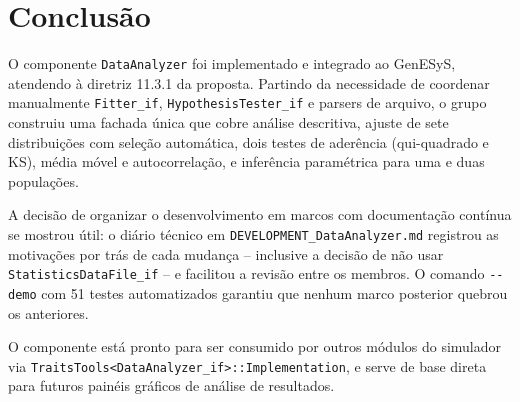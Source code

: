 \section{Conclusão}

O componente \texttt{DataAnalyzer} foi implementado e integrado ao GenESyS, atendendo à diretriz 11.3.1 da proposta. Partindo da necessidade de coordenar manualmente \texttt{Fitter\_if}, \texttt{HypothesisTester\_if} e parsers de arquivo, o grupo construiu uma fachada única que cobre análise descritiva, ajuste de sete distribuições com seleção automática, dois testes de aderência (qui-quadrado e KS), média móvel e autocorrelação, e inferência paramétrica para uma e duas populações.

A decisão de organizar o desenvolvimento em marcos com documentação contínua se mostrou útil: o diário técnico em \texttt{DEVELOPMENT\_DataAnalyzer.md} registrou as motivações por trás de cada mudança -- inclusive a decisão de não usar \texttt{StatisticsDataFile\_if} -- e facilitou a revisão entre os membros. O comando \texttt{-{}-demo} com 51 testes automatizados garantiu que nenhum marco posterior quebrou os anteriores.

O componente está pronto para ser consumido por outros módulos do simulador via \texttt{TraitsTools<DataAnalyzer\_if>::Implementation}, e serve de base direta para futuros painéis gráficos de análise de resultados.
